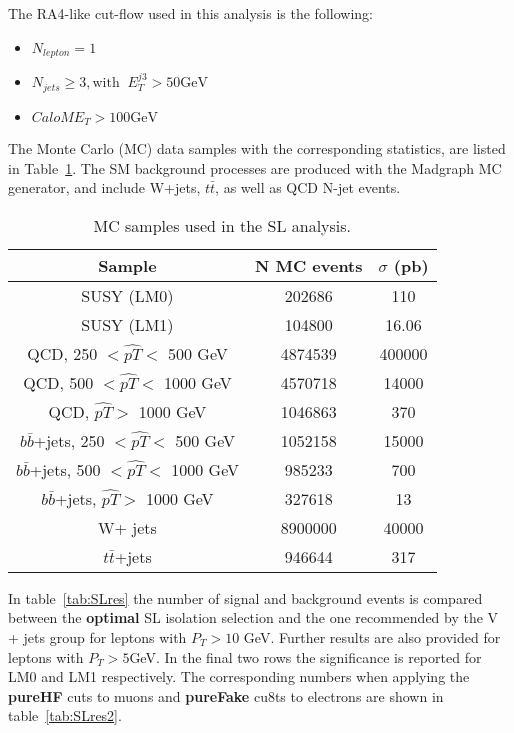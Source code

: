 The RA4-like cut-flow used in this analysis is the following: 

\begin{itemize}
\item $N_{lepton} = 1$
\item $N_{jets} \geq 3, \textrm{with} \;\; E_{T}^{j3} > 50 \textrm{GeV}$
\item $CaloME_{T} > 100 \textrm{GeV}$
\end{itemize}

The Monte Carlo (MC) data samples with the corresponding statistics, are listed in Table~\ref{tab:SLsamples}. The SM background processes are produced with the Madgraph MC generator, and include W+jets, $t \bar{t}$, as well as QCD N-jet events.

\begin{table}[htb]

\begin{center}
\begin{tabular}{|c|c|c|}
\hline
Sample  &  N MC events & $\sigma$ (pb) \\
\hline
SUSY (LM0) & 202686 & 110\\
SUSY (LM1) & 104800 & 16.06\\
\hline
QCD, 250 $<\hat{pT}<$ 500 GeV  & 4874539 & 400000\\
QCD, 500 $<\hat{pT}<$ 1000 GeV  & 4570718 & 14000\\
QCD, $\hat{pT}>$ 1000 GeV  & 1046863 & 370 \\ \hline
$b\bar{b}$+jets, 250 $<\hat{pT}<$ 500 GeV  & 1052158 & 15000\\
$b\bar{b}$+jets, 500 $<\hat{pT}<$ 1000 GeV  & 985233 & 700\\
$b\bar{b}$+jets, $\hat{pT}>$ 1000 GeV  & 327618 & 13  \\
\hline
W+ jets&8900000 & 40000 \\
\hline
$t \bar{t}$+jets& 946644& 317 \\
\hline
\end{tabular}
\caption{\small{MC samples used in the SL analysis.}\label{tab:SLsamples}}
\end{center}
\end{table}


In table~\ref{tab:SLres} the number of signal and background events is compared between the {\bf optimal} SL isolation selection and the one recommended by the
V + jets group for leptons with $P_{T} > 10$ GeV. Further results are also provided for leptons with $P_{T}>5$GeV. In the final two rows the significance is reported for LM0 and LM1 respectively. The corresponding numbers when applying the {\bf pureHF} cuts to muons and {\bf pureFake} cu8ts to electrons are shown in table~\ref{tab:SLres2}.

